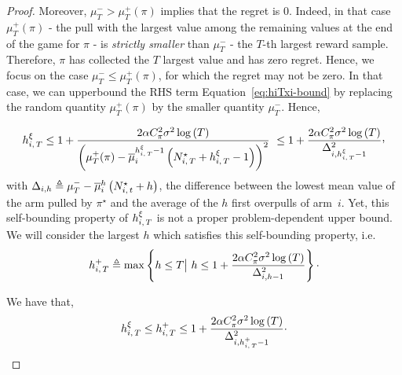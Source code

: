\begin{proof}
Moreover, $\mu_T^- > \mu_T^+(\pi)$ implies that the regret is 0. Indeed, in that case $\mu_T^+(\pi)$ - the pull with the largest value among the remaining values at the end of the game for $\pi$ - is \emph{strictly smaller} than $\mu_T^-$ - the $T$-th largest reward sample.  Therefore, $\pi$ has collected the $T$ largest value and has zero regret. Hence, we focus on the case $\mu^-_T\leq \mu^+_T(\pi)$, for which the regret may not be zero.  In that case, we can upperbound the RHS term Equation~\ref{eq:hiTxi-bound} by replacing the random quantity $\mu_T^+(\pi)$ by the smaller quantity $\mu^-_T$. Hence, 

\[
\hiT^\xi \leq 1 + \frac{2\alpha C_\pi^2 \sigma^2\log\pa{T}}{\pa{\mu_T^+(\pi)- \bmu_i^{\hiT^\xi  - 1} \left( \NiT^\star + \hiT^\xi   - 1 \right) }^2 }\ \leq 1 + \frac{2\alpha C_\pi^2 \sigma^2\log\pa{T}}{\Delta_{i,\hiT^\xi  - 1}^2}\CommaBin
\] 
with $\Delta_{i,h} \triangleq \mu^-_T- \overline{\mu}_i^h\left( N_{i,\,t}^\star+h \right)$, the difference between the lowest mean value of the arm pulled by $\pi^\star$ and the average of the $h$ first overpulls of arm~$i$. Yet, this self-bounding property of $h_{i,\,T}^\xi $ is not a proper problem-dependent upper bound. We will consider the largest $h$ which satisfies this self-bounding property, i.e.
\begin{equation*}
 \hiT^+  \triangleq \max \left\{ h \leq T \big| \ h \leq  1 + \frac{2\alpha C_\pi^2 \sigma^2 \log \pa{T}}{\Delta_{i,h-1}^2} \right\}\cdot
\end{equation*}

We have that,
\begin{equation*}
h_{i,\,T}^\xi \leq  h_{i,\,T}^+  \leq  1 + \frac{2\alpha C_\pi^2 \sigma^2 \log \left(T\right)}{\Delta_{i,h_{i,\,T}^+-1}^2}\cdot
\end{equation*}


\end{proof}
\restaalgoub*
